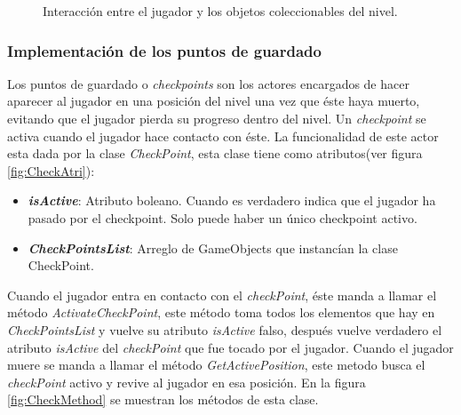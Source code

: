 			\begin{figure}[h]
	  		\centering
	   
			
	  		\caption{Interacción entre el jugador y los objetos coleccionables del nivel.}
	  		\label{fig:CollectableObjects}
		\end{figure}

\subsubsection{Implementación de los puntos de guardado}
Los puntos de guardado o \textit{checkpoints} son los actores encargados de 
hacer aparecer al jugador en una posición del nivel una vez que éste haya muerto, 
evitando que el jugador pierda su progreso dentro del nivel. Un 
\textit{checkpoint} se activa cuando el jugador hace contacto con éste. La 
funcionalidad de este actor esta dada por la clase \textit{CheckPoint}, esta clase 
tiene como atributos(ver figura \ref{fig:CheckAtri}):

\begin{itemize}
	\item \textit{\textbf{isActive}}: Atributo boleano. Cuando es verdadero indica 
	que el jugador  ha pasado por el checkpoint. Solo puede haber un único checkpoint 
	activo.
	\item \textit{\textbf{CheckPointsList}}: Arreglo de GameObjects que instancían 
	la clase CheckPoint.
\end{itemize}

Cuando el jugador entra en contacto con el \textit{checkPoint}, éste manda a 
llamar el método \textit{ActivateCheckPoint}, este método toma todos los 
elementos que hay en  \textit{CheckPointsList} y vuelve su atributo 
\textit{isActive} falso, después vuelve verdadero el atributo \textit{isActive} 
del \textit{checkPoint} que fue tocado por el jugador. Cuando el jugador muere 
se manda a llamar el  método \textit{GetActivePosition}, este metodo busca el 
\textit{checkPoint} activo y revive al jugador en esa posición. En la figura 
\ref{fig:CheckMethod} se muestran los métodos de esta clase. 

